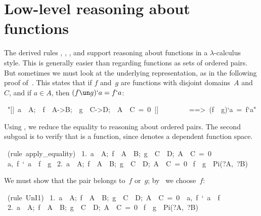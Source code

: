\section{Low-level reasoning about functions}
The derived rules , , , 
and  support reasoning about functions in a
$\lambda$-calculus style.  This is generally easier than regarding
functions as sets of ordered pairs.  But sometimes we must look at the
underlying representation, as in the following proof
of~.  This states that if $f$ and~$g$ are
functions with disjoint domains~$A$ and~$C$, and if $a\in A$, then
$(f\un g)`a = f`a$:
\begin{isabelle}
\ "[|\ a\ \isasymin \ A;\ \ f\ \isasymin \ A->B;\ \ g\ \isasymin \ C->D;\ \ A\ \isasyminter \ C\ =\ 0\ |]
\isanewline
\ \ \ \ \ \ \ \ ==>\ (f\ \isasymunion \ g)`a\ =\ f`a"
\end{isabelle}
Using , we reduce the equality to reasoning about
ordered pairs.  The second subgoal is to verify that  is a function, since
 denotes a dependent function space.
\begin{isabelle}
\ (rule\ apply\_equality)\isanewline
\ 1.\ \isasymlbrakk a\ \isasymin \ A;\ f\ \isasymin \ A\ \isasymrightarrow \ B;\ g\ \isasymin \ C\ \isasymrightarrow \ D;\ A\ \isasyminter \ C\ =\ 0\isasymrbrakk \isanewline
{}\isasymLongrightarrow \ \isasymlangle a,\ f\ `\ a\isasymrangle \ \isasymin \ f\ \isasymunion \ g\isanewline
\ 2.\ \isasymlbrakk a\ \isasymin \ A;\ f\ \isasymin \ A\ \isasymrightarrow \ B;\ g\ \isasymin \ C\ \isasymrightarrow \ D;\ A\ \isasyminter \ C\ =\ 0\isasymrbrakk \isanewline
{}\isasymLongrightarrow \ f\ \isasymunion \ g\ \isasymin \ Pi(?A,\ ?B)
\end{isabelle}
We must show that the pair belongs to~$f$ or~$g$; by~ we
choose~$f$:
\begin{isabelle}
\ (rule\ UnI1)\isanewline
\ 1.\ \isasymlbrakk a\ \isasymin \ A;\ f\ \isasymin \ A\ \isasymrightarrow \ B;\ g\ \isasymin \ C\ \isasymrightarrow \ D;\ A\ \isasyminter \ C\ =\ 0\isasymrbrakk \ \isasymLongrightarrow \ \isasymlangle a,\ f\ `\ a\isasymrangle \ \isasymin \ f\isanewline
\ 2.\ \isasymlbrakk a\ \isasymin \ A;\ f\ \isasymin \ A\ \isasymrightarrow \ B;\ g\ \isasymin \ C\ \isasymrightarrow \ D;\ A\ \isasyminter \ C\ =\ 0\isasymrbrakk \isanewline
{}\isasymLongrightarrow \ f\ \isasymunion \ g\ \isasymin \ Pi(?A,\ ?B)
\end{isabelle}
